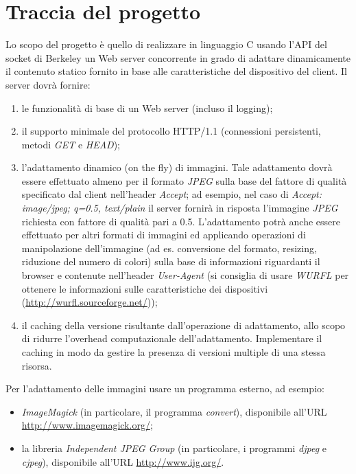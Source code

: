 \documentclass[paper=a4, oneside, fontsize=14pt, titlepage]{article}
\begin{document}
	\section{Traccia del progetto}
	\begin{flushleft}
		Lo scopo del progetto è quello di realizzare in linguaggio C usando l'API del socket di Berkeley un Web	server concorrente in grado di adattare dinamicamente il contenuto statico fornito in base alle caratteristiche del dispositivo del client. Il server dovrà fornire:
		\begin{enumerate}
			\item le funzionalità di base di un Web server (incluso il logging);
			\item il supporto minimale del protocollo HTTP/1.1 (connessioni persistenti, metodi \textit{GET} e \textit{HEAD});
			\item l'adattamento dinamico (on the fly) di immagini. Tale adattamento dovrà essere effettuato almeno per il formato \textit{JPEG} sulla base del fattore di qualità specificato dal client nell’header	\textit{Accept}; ad esempio, nel caso di \textit{Accept: image/jpeg; q=0.5, text/plain} il server fornirà in risposta l’immagine \textit{JPEG} richiesta con fattore di qualità pari a 0.5. L’adattamento potrà anche essere effettuato per altri formati di immagini ed applicando operazioni di manipolazione dell’immagine (ad es. conversione del formato, resizing, riduzione del numero di colori) sulla base di informazioni riguardanti il browser e contenute nell’header \textit{User-Agent} (si consiglia di usare \textit{WURFL} per ottenere le informazioni sulle caratteristiche dei dispositivi (\url{http://wurfl.sourceforge.net/}));
			\item il caching della versione risultante dall’operazione di adattamento, allo scopo di ridurre l’overhead computazionale dell’adattamento. Implementare il caching in modo da gestire la presenza di versioni multiple di una stessa risorsa.
		\end{enumerate}
		Per l’adattamento delle immagini usare un programma esterno, ad esempio:
		\begin{itemize}
			\item \textit{ImageMagick} (in particolare, il programma \textit{convert}), disponibile all’URL \url{http://www.imagemagick.org/};
			\item la libreria \textit{Independent JPEG Group} (in particolare, i programmi \textit{djpeg} e \textit{cjpeg}), disponibile all’URL \url{http://www.ijg.org/}.
		\end{itemize}

\end{flushleft}
\end{document}
